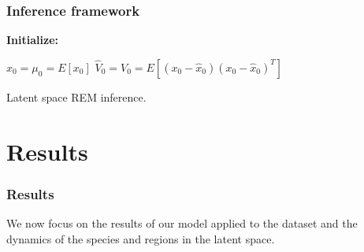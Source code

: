 \documentclass[
	11pt, %
]{beamer}
\begin{document}
%
%
%
%
%

\begin{frame}
\frametitle{Inference framework}
\smallskip

\begin{algorithm}[H]

\textbf{Initialize: }
\begin{substeps}
$\hat{x}_0 = \mu_0 = E[x_0]$ \;
$\hat{V}_0 = V_0 = E[(x_0-\hat{x}_0)(x_0-\hat{x}_0)^T]$  \;
\end{substeps}
\caption{Latent space REM inference.}
\label{algo:rem_latent}
\end{algorithm}
\end{frame}

\section{Results}

\begin{frame}
\frametitle{Results}

We now focus on the results of our model applied to the dataset and the dynamics of the species and regions in the latent space.
\end{frame}
\end{document}
